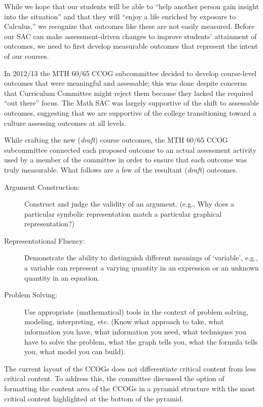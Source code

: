 While we hope that our students will be able to ``help another person gain insight into the situation'' and that they will ``enjoy a life enriched by exposure to Calculus,'' we recognize that outcomes like these are not easily measured.
Before our SAC can make assessment-driven changes to improve students' attainment of outcomes, we need to first develop measurable outcomes that represent the intent of our courses.

In 2012/13 the MTH 60/65 CCOG subcommittee decided to develop course-level outcomes that were meaningful and assessable; this was done despite concerns that Curriculum Committee might reject them because they lacked the required ``out there'' focus.
The Math SAC was largely supportive of the shift to assessable outcomes, suggesting that we are supportive of the college transitioning toward a culture assessing outcomes at all levels.

While crafting the new (\emph{draft}) course outcomes, the MTH 60/65 CCOG subcommittee connected each proposed outcome to an actual assessment activity used by a member of the committee in order to ensure that each outcome was truly measurable.
What follows are a few of the resultant (\emph{draft}) outcomes.
\begin{description}
	\item[Argument Construction:] Construct and judge the validity of an argument.
	      (e.g., Why does a particular symbolic representation match a particular
	      graphical representation?)

	\item[Representational Fluency:] Demonstrate the ability to distinguish
	      different meanings of `variable', e.g., a variable can represent a varying
	      quantity in an expression or an unknown quantity in an equation.

	\item[Problem Solving:] Use appropriate (mathematical) tools in the context of
	      problem solving, modeling, interpreting, etc.
	      (Know what approach to take, what information you have, what information you need, what techniques you have to solve the problem, what the graph tells you, what the formula tells you, what model you can build).
\end{description}

The current layout of the CCOGs does not differentiate critical content from less critical content.
To address this, the committee discussed the option of formatting the content area of the CCOGs in a pyramid structure with the most critical content highlighted at the bottom of the pyramid.

